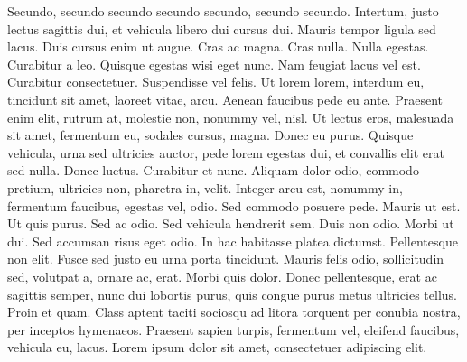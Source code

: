 \documentclass[draft,12pt,twoside,a4paper]{book}
\begin{document}
Secundo, secundo secundo secundo secundo, secundo secundo.
Intertum, justo lectus sagittis dui, et vehicula libero dui cursus dui.
Mauris tempor ligula sed lacus.
Duis cursus enim ut augue.
Cras ac magna.
Cras nulla.
Nulla egestas.
Curabitur a leo.
Quisque egestas wisi eget nunc.
Nam feugiat lacus vel est.
Curabitur consectetuer.
Suspendisse vel felis.
Ut lorem lorem, interdum eu, tincidunt sit amet, laoreet vitae, arcu.
Aenean faucibus pede eu ante.
Praesent enim elit, rutrum at, molestie non, nonummy vel, nisl.
Ut lectus eros, malesuada sit amet, fermentum eu, sodales cursus, magna.
Donec eu purus.
Quisque vehicula, urna sed ultricies auctor, pede lorem egestas dui,
 et convallis elit erat sed nulla.
Donec luctus.
Curabitur et nunc.
Aliquam dolor odio, commodo pretium, ultricies non, pharetra in, velit.
Integer arcu est, nonummy in, fermentum faucibus, egestas vel, odio.
Sed commodo posuere pede.
Mauris ut est.
Ut quis purus.
Sed ac odio.
Sed vehicula hendrerit sem.
Duis non odio.
Morbi ut dui.
Sed accumsan risus eget odio.
In hac habitasse platea dictumst.
Pellentesque non elit.
Fusce sed justo eu urna porta tincidunt.
Mauris felis odio, sollicitudin sed, volutpat a, ornare ac, erat.
Morbi quis dolor.
Donec pellentesque, erat ac sagittis semper, nunc dui lobortis purus,
 quis congue purus metus ultricies tellus.
Proin et quam.
Class aptent taciti sociosqu ad litora torquent per conubia nostra,
 per inceptos hymenaeos.
Praesent sapien turpis, fermentum vel, eleifend faucibus, vehicula eu, lacus.
Lorem ipsum dolor sit amet, consectetuer adipiscing elit.
\end{document}

